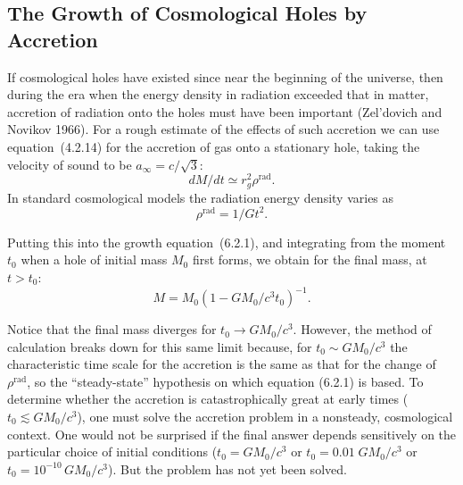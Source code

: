 

\subsection{The Growth of Cosmological Holes by Accretion}
\label{sec:6.2}

If cosmological holes have existed since near the beginning of the universe,
then during the era when the energy density in radiation exceeded that in matter,
accretion of radiation onto the holes must have been important (Zel'dovich and
Novikov 1966).  For a rough estimate of the effects of such accretion we can use
equation~(4.2.14) for the accretion of gas onto a stationary hole, taking the
velocity of sound to be $a_\infty = c/\sqrt{3}$:
%
\begin{equation}
\tag{6.2.1}
dM/dt \simeq r_g^2 \rho^{\text{rad}}\!.
\end{equation}
%
In standard cosmological models the radiation energy density varies as
%
\begin{equation}
\tag{6.2.2}
\rho^{\text{rad}} = 1/Gt^2.
\end{equation}

Putting this into the growth equation~(6.2.1), and integrating from the moment
$t_0$ when a hole of initial mass $M_0$ first forms, we obtain for the final mass, at
$t > t_0$:
%
\begin{equation}
\tag{6.2.3}
M = M_0 (1 - G M_0 / c^3 t_0)^{-1}.
\end{equation}

Notice that the final mass diverges for $t_0 \to GM_0/c^3$.  However, the method of
calculation breaks down for this same limit because, for $t_0 \sim GM_0/c^3$ the
characteristic time scale for the accretion is the same as that for the change of
$\rho^{\text{rad}}$, so the ``steady-state'' hypothesis on which equation
(6.2.1) is based.  To determine whether the accretion is catastrophically great at
early times ($t_0 \lesssim GM_0/c^3$), one must solve the accretion problem in a nonsteady,
cosmological context.  One would not be surprised if the final answer depends
sensitively on the particular choice of initial conditions ($t_0 = GM_0/c^3$ or
$t_0 = 0.01\;GM_0/c^3$ or $t_0 = 10^{-10}\,GM_0/c^3$).  But the problem has not yet been
solved.

